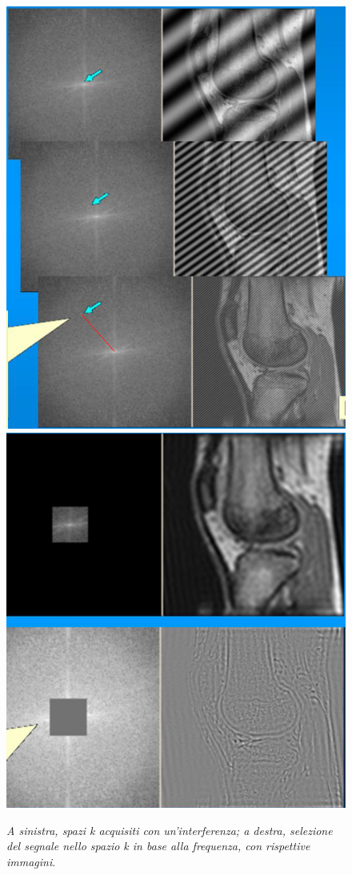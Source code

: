 \documentclass{report}
\numberwithin{equation}{section}
\numberwithin{figure}{section}
\begin{document}
\begin{figure}[htp]
\centering
\includegraphics[scale=0.505]{immagini/k2.png}\quad\includegraphics[scale=0.5]{immagini/k3.png}
\caption{\label{fig:k2} \textit{A sinistra, spazi k acquisiti con un'interferenza; a destra, selezione del segnale nello spazio k in base alla frequenza, con rispettive immagini}.}
\end{figure}
\end{document}
